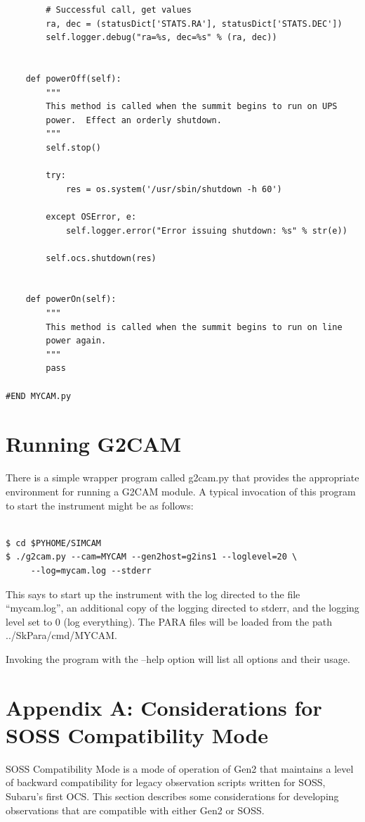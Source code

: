 \documentclass[11pt]{report}
\begin{document}
\begin{verbatim}
        # Successful call, get values
        ra, dec = (statusDict['STATS.RA'], statusDict['STATS.DEC'])
        self.logger.debug("ra=%s, dec=%s" % (ra, dec))


    def powerOff(self):
        """
        This method is called when the summit begins to run on UPS
        power.  Effect an orderly shutdown.
        """
        self.stop()

        try:
            res = os.system('/usr/sbin/shutdown -h 60')

        except OSError, e:
            self.logger.error("Error issuing shutdown: %s" % str(e))

        self.ocs.shutdown(res)


    def powerOn(self):
        """
        This method is called when the summit begins to run on line
        power again.
        """
        pass
    
#END MYCAM.py
\end{verbatim}

\chapter{Running G2CAM}
There is a simple wrapper program called g2cam.py that provides the
appropriate environment for running a G2CAM module. A typical invocation
of this program to start the instrument might be as follows: 
\begin{verbatim}

$ cd $PYHOME/SIMCAM
$ ./g2cam.py --cam=MYCAM --gen2host=g2ins1 --loglevel=20 \
     --log=mycam.log --stderr 

\end{verbatim}
This says to start up the instrument with the log directed to the file
``mycam.log'', an additional copy of the logging directed to stderr, and
the logging level set to 0 (log everything). The PARA files will be
loaded from the path ../SkPara/cmd/MYCAM. 

Invoking the program with the --help option will list all options and
their usage. 

\chapter{Appendix A: Considerations for SOSS Compatibility Mode}
SOSS Compatibility Mode is a mode of operation of Gen2 that maintains a
level of backward compatibility for legacy observation scripts written
for SOSS, Subaru's first OCS. This section describes some considerations
for developing observations that are compatible with either Gen2 or
SOSS. 
\end{document}
